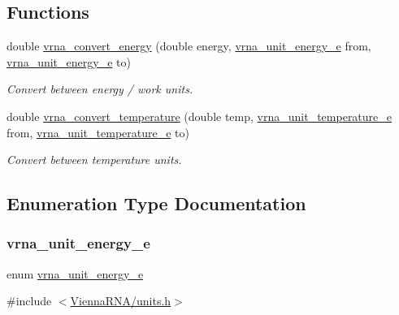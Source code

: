 \subsection*{Functions}
\begin{DoxyCompactItemize}
\item 
double \mbox{\hyperlink{group__units_gada3216e97b410928ba19a4487e5fe6f2}{vrna\+\_\+convert\+\_\+energy}} (double energy, \mbox{\hyperlink{group__units_ga1d2fd1e73caf995e4dc69072b33e6ba5}{vrna\+\_\+unit\+\_\+energy\+\_\+e}} from, \mbox{\hyperlink{group__units_ga1d2fd1e73caf995e4dc69072b33e6ba5}{vrna\+\_\+unit\+\_\+energy\+\_\+e}} to)
\begin{DoxyCompactList}\small\item\em Convert between energy / work units. \end{DoxyCompactList}\item 
double \mbox{\hyperlink{group__units_gaf1bb1db32eba33b9f306214f5955d0c2}{vrna\+\_\+convert\+\_\+temperature}} (double temp, \mbox{\hyperlink{group__units_gadeca8d9e91ef85f1b652cc8aef63d7e4}{vrna\+\_\+unit\+\_\+temperature\+\_\+e}} from, \mbox{\hyperlink{group__units_gadeca8d9e91ef85f1b652cc8aef63d7e4}{vrna\+\_\+unit\+\_\+temperature\+\_\+e}} to)
\begin{DoxyCompactList}\small\item\em Convert between temperature units. \end{DoxyCompactList}\end{DoxyCompactItemize}


\subsection{Enumeration Type Documentation}
\mbox{\label{group__units_ga1d2fd1e73caf995e4dc69072b33e6ba5}} 
\subsubsection{\texorpdfstring{vrna\_unit\_energy\_e}{vrna\_unit\_energy\_e}}
{\footnotesize\ttfamily enum \mbox{\hyperlink{group__units_ga1d2fd1e73caf995e4dc69072b33e6ba5}{vrna\+\_\+unit\+\_\+energy\+\_\+e}}}



{\ttfamily \#include $<$\mbox{\hyperlink{units_8h}{Vienna\+R\+N\+A/units.\+h}}$>$}




